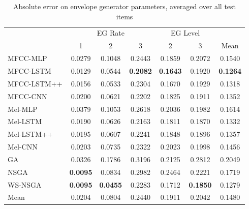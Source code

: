 

\begin{table}[ht]
\centering
\begin{tabular}{l|ccc|cc|c}
\toprule
{} & \multicolumn{3}{c}{EG Rate} & \multicolumn{2}{c}{EG Level} & {} \\
{} & 1 & 2 & 3 & 2 & 3 & Mean \\
\midrule
MFCC-MLP    &     0.0279 &     0.1048 &     0.2443 &      0.1859 &      0.2072 &   0.1540 \\
MFCC-LSTM   &     0.0129 &     0.0544 &     \textbf{0.2082} &      \textbf{0.1643} &      0.1920 &   \textbf{0.1264} \\
MFCC-LSTM++ &     0.0156 &     0.0533 &     0.2304 &      0.1670 &      0.1929 &   0.1318 \\
MFCC-CNN    &     0.0200 &     0.0621 &     0.2202 &      0.1825 &      0.1911 &   0.1352 \\
\midrule
Mel-MLP     &     0.0379 &     0.1053 &     0.2618 &      0.2036 &      0.1982 &   0.1614 \\
Mel-LSTM    &     0.0190 &     0.0626 &     0.2163 &      0.1811 &      0.1870 &   0.1332 \\
Mel-LSTM++  &     0.0195 &     0.0607 &     0.2241 &      0.1848 &      0.1896 &   0.1357 \\
Mel-CNN     &     0.0203 &     0.0735 &     0.2322 &      0.2023 &      0.1998 &   0.1456 \\
\midrule
GA          &     0.0326 &     0.1786 &     0.3196 &      0.2125 &      0.2812 &   0.2049 \\
NSGA        &     \textbf{0.0095} &     0.0834 &     0.2982 &      0.2464 &      0.2221 &   0.1719 \\
WS-NSGA     &     \textbf{0.0095} &     \textbf{0.0455} &     0.2283 &      0.1712 &      \textbf{0.1850} &   0.1279 \\
\midrule
Mean        &     0.0204 &     0.0804 &     0.2440 &      0.1911 &      0.2042 &   0.1480 \\
\bottomrule
\end{tabular}
\caption{Absolute error on envelope generator parameters, averaged over all test items}
\label{tbl:param_eval_eg}
\end{table}

